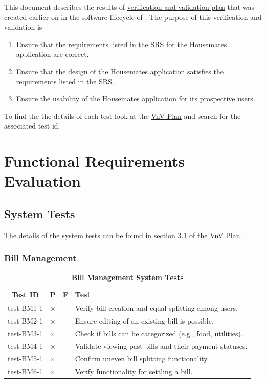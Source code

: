 \documentclass[12pt, titlepage]{article}
\begin{document}
This document describes the results of \href{https://github.com/DangJustin/CapstoneProject/blob/main/docs/VnVPlan/VnVPlan.pdf}{verification and validation plan} that was created earlier on in the software lifecycle of \progname{}. The purpose of this verification and validation  is \begin{enumerate}
    \item Ensure that the requirements listed in the SRS for the Housemates application are correct.
    \item Ensure that the design of the Housemates application satisfies the requirements listed in the SRS.
    \item Ensure the usability of the Housemates application for its prospective users.
\end{enumerate}

To find the the details of each test look at the \href{https://github.com/DangJustin/CapstoneProject/blob/main/docs/VnVPlan/VnVPlan.pdf}{VnV Plan} and search for the associated test id.

\section{Functional Requirements Evaluation}

\subsection{System Tests}

The details of the system tests can be found in section 3.1 of the \href{https://github.com/DangJustin/CapstoneProject/blob/main/docs/VnVPlan/VnVPlan.pdf}{VnV Plan}.

\subsubsection{Bill Management}

\begin{table}[H]
\centering
\begin{tabular}{|c|c|c|p{6cm}|}
\hline
Test ID & P & F & Test\\
\hline 
test-BM1-1 & $\times$ & & Verify bill creation and equal splitting among users.\\
\hline 
test-BM2-1 & $\times$ & & Ensure editing of an existing bill is possible.\\
\hline 
test-BM3-1 & $\times$ & & Check if bills can be categorized (e.g., food, utilities).\\
\hline 
test-BM4-1 & $\times$ & & Validate viewing past bills and their payment statuses.\\
\hline 
test-BM5-1 & $\times$ & & Confirm uneven bill splitting functionality.\\
\hline 
test-BM6-1 & $\times$ & & Verify functionality for settling a bill.\\
\hline
\end{tabular}
\caption{\bf Bill Management System Tests}
\end{table}
\end{document}
